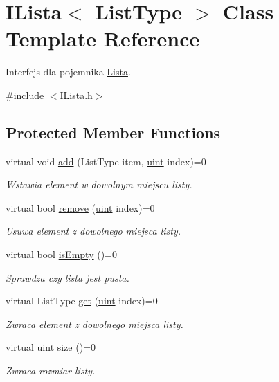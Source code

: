 \hypertarget{class_i_lista}{\section{I\-Lista$<$ List\-Type $>$ Class Template Reference}
\label{class_i_lista}
}


Interfejs dla pojemnika \hyperlink{class_lista}{Lista}.  




{\ttfamily \#include $<$I\-Lista.\-h$>$}

\subsection*{Protected Member Functions}
\begin{DoxyCompactItemize}
\item 
virtual void \hyperlink{class_i_lista_a756c44e78597aca5c7442645cf1f3cd5}{add} (List\-Type item, \hyperlink{_i_lista_8h_a91ad9478d81a7aaf2593e8d9c3d06a14}{uint} index)=0
\begin{DoxyCompactList}\small\item\em Wstawia element w dowolnym miejscu listy. \end{DoxyCompactList}\item 
virtual bool \hyperlink{class_i_lista_afbfc2fddaeb3cffb76cf92bb4a25ea1e}{remove} (\hyperlink{_i_lista_8h_a91ad9478d81a7aaf2593e8d9c3d06a14}{uint} index)=0
\begin{DoxyCompactList}\small\item\em Usuwa element z dowolnego miejsca listy. \end{DoxyCompactList}\item 
virtual bool \hyperlink{class_i_lista_ad902b7932a4d28d6c6c86d59111c4bd0}{is\-Empty} ()=0
\begin{DoxyCompactList}\small\item\em Sprawdza czy lista jest pusta. \end{DoxyCompactList}\item 
virtual List\-Type \hyperlink{class_i_lista_a6cf7937df214e06927df32046e231d08}{get} (\hyperlink{_i_lista_8h_a91ad9478d81a7aaf2593e8d9c3d06a14}{uint} index)=0
\begin{DoxyCompactList}\small\item\em Zwraca element z dowolnego miejsca listy. \end{DoxyCompactList}\item 
virtual \hyperlink{_i_lista_8h_a91ad9478d81a7aaf2593e8d9c3d06a14}{uint} \hyperlink{class_i_lista_a82a9479c66bc41f61e186769fa59c04b}{size} ()=0
\begin{DoxyCompactList}\small\item\em Zwraca rozmiar listy. \end{DoxyCompactList}\end{DoxyCompactItemize}


